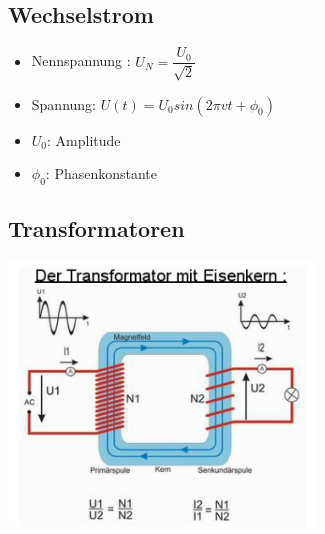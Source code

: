 \documentclass[8pt,a4paper]{scrartcl}
\begin{document}
\begin{multicols*}{3}
				\subsection{Wechselstrom}
					\begin{itemize}\itemsep0pt
						\item Nennspannung : $U_{N} = \dfrac{U_{0}}{\sqrt{2}}$
						\item Spannung: $U(t) = U_{0}sin(2\pi vt + \phi_{0})$
						\item $U_{0}$: Amplitude
						\item $\phi_{0}$: Phasenkonstante
					\end{itemize}	
				\subsection{Transformatoren}
					\includegraphics[height=7cm]{img/transformator.png} 

\end{multicols*}

\end{document}
